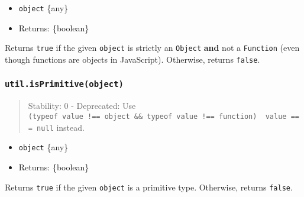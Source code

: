 \begin{itemize}
\tightlist
\item
  \texttt{object} \{any\}
\item
  Returns: \{boolean\}
\end{itemize}

Returns \texttt{true} if the given \texttt{object} is strictly an
\texttt{Object} \textbf{and} not a \texttt{Function} (even though
functions are objects in JavaScript). Otherwise, returns \texttt{false}.

\begin{Shaded}
\begin{Highlighting}[]
\OperatorTok{=} \NormalTok{(}\NormalTok{)}\OperatorTok{;}

\NormalTok{(}\NormalTok{)}\OperatorTok{;}
\NormalTok{(}\NormalTok{)}\OperatorTok{;}
\NormalTok{(\{\})}\OperatorTok{;}
\NormalTok{(() }\KeywordTok{=\textgreater{}}\NormalTok{ \{\})}\OperatorTok{;}
\end{Highlighting}
\end{Shaded}

\subsubsection{\texorpdfstring{\texttt{util.isPrimitive(object)}}{util.isPrimitive(object)}}\label{util.isprimitiveobject}

\begin{quote}
Stability: 0 - Deprecated: Use
\texttt{(typeof\ value\ !==\ \textquotesingle{}object\textquotesingle{}\ \&\&\ typeof\ value\ !==\ \textquotesingle{}function\textquotesingle{})\ \textbar{}\textbar{}\ value\ ===\ null}
instead.
\end{quote}

\begin{itemize}
\tightlist
\item
  \texttt{object} \{any\}
\item
  Returns: \{boolean\}
\end{itemize}

Returns \texttt{true} if the given \texttt{object} is a primitive type.
Otherwise, returns \texttt{false}.


